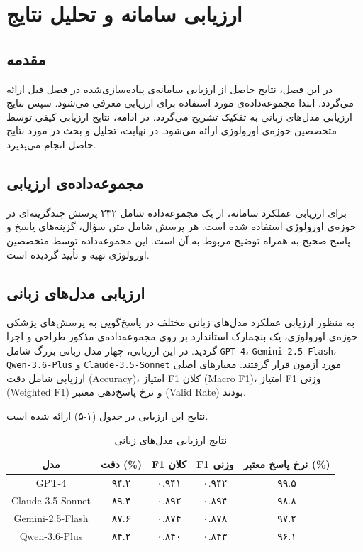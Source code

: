 \chapter{ارزیابی سامانه و تحلیل نتایج}\label{Chap:chap5}

\section{مقدمه}

در این فصل، نتایج حاصل از ارزیابی سامانه‌ی پیاده‌سازی‌شده در فصل قبل ارائه می‌گردد. ابتدا مجموعه‌داده‌ی مورد استفاده برای ارزیابی معرفی می‌شود. سپس نتایج ارزیابی مدل‌های زبانی به تفکیک تشریح می‌گردد. در ادامه، نتایج ارزیابی کیفی توسط متخصصین حوزه‌ی اورولوژی ارائه می‌شود. در نهایت، تحلیل و بحث در مورد نتایج حاصل انجام می‌پذیرد.

\section{مجموعه‌داده‌ی ارزیابی}

برای ارزیابی عملکرد سامانه، از یک مجموعه‌داده شامل ۲۳۲ پرسش چندگزینه‌ای در حوزه‌ی اورولوژی استفاده شده است. هر پرسش شامل متن سؤال، گزینه‌های پاسخ و پاسخ صحیح به همراه توضیح مربوط به آن است. این مجموعه‌داده توسط متخصصین اورولوژی تهیه و تأیید گردیده است.

\section{ارزیابی مدل‌های زبانی}

به منظور ارزیابی عملکرد مدل‌های زبانی مختلف در پاسخ‌گویی به پرسش‌های پزشکی حوزه‌ی اورولوژی، یک بنچمارک استاندارد بر روی مجموعه‌داده‌ی مذکور طراحی و اجرا گردید. در این ارزیابی، چهار مدل زبانی بزرگ شامل \texttt{GPT-4}، \texttt{Gemini-2.5-Flash}، \texttt{Qwen-3.6-Plus} و \texttt{Claude-3.5-Sonnet} مورد آزمون قرار گرفتند. معیارهای اصلی ارزیابی شامل دقت (Accuracy)، امتیاز F1 کلان (Macro F1)، امتیاز F1 وزنی (Weighted F1) و نرخ پاسخ‌دهی معتبر (Valid Rate) بودند.

نتایج این ارزیابی در جدول (۱-۵) ارائه شده است.

\begin{table}[ht]
\centering
\caption{نتایج ارزیابی مدل‌های زبانی}
\label{tab:model_evaluation}
\begin{tabular}{|c|c|c|c|c|}
\hline
\textbf{مدل} & \textbf{دقت (\%)} & \textbf{F1 کلان} & \textbf{F1 وزنی} & \textbf{نرخ پاسخ معتبر (\%)} \\
\hline
GPT-4 & ۹۴.۲ & ۰.۹۴۱ & ۰.۹۴۲ & ۹۹.۵ \\
\hline
Claude-3.5-Sonnet & ۸۹.۴ & ۰.۸۹۲ & ۰.۸۹۴ & ۹۸.۸ \\
\hline
Gemini-2.5-Flash & ۸۷.۶ & ۰.۸۷۴ & ۰.۸۷۸ & ۹۷.۲ \\
\hline
Qwen-3.6-Plus & ۸۴.۲ & ۰.۸۴۰ & ۰.۸۴۳ & ۹۶.۱ \\
\hline
\end{tabular}
\end{table}

